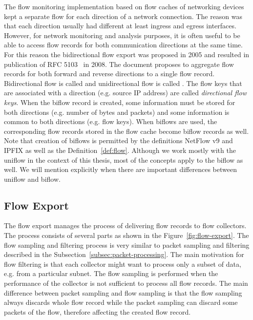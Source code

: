 The flow monitoring implementation based on flow caches of networking devices kept a separate flow for each direction of a network connection. The reason was that each direction usually had different at least  ingress and egress interfaces. However, for network monitoring and analysis purposes, it is often useful to be able to access flow records for both communication directions at the same time. For this reason the bidirectional flow export was proposed in 2005 and resulted in publication of RFC 5103~\cite{rfc5103} in 2008. The document proposes to aggregate flow records for both forward and reverse directions to a single flow record. Bidirectional flow is called \emph{} and unidirectional flow is called \emph{}. The flow keys that are associated with a direction (e.g. source IP address) are called \emph{directional flow keys}. When the biflow record is created, some information must be stored for both directions (e.g. number of bytes and packets) and some information is common to both directions (e.g. flow keys). When biflows are used, the corresponding flow records stored in the flow cache become biflow records as well. Note that creation of biflows is permitted by the definitions NetFlow v9 and IPFIX as well as the Definition~\ref{def:flow}. Although we work mostly with the uniflow in the context of this thesis, most of the concepts apply to the biflow as well. We will mention explicitly when there are important differences between uniflow and biflow.

\subsection{Flow Export}

The flow export manages the process of delivering flow records to flow collectors. The process consists of several parts as shown in the Figure~\ref{fig:flow-export}. The flow sampling and filtering process is very similar to packet sampling and filtering described in the Subsection~\ref{subsec:packet-processing}. The main motivation for flow filtering is that each collector might want to process only a subset of data, e.g. from a particular subnet. The flow sampling is performed when the performance of the collector is not sufficient to process all flow records. The main difference between packet sampling and flow sampling is that the flow sampling always discards whole flow record while the packet sampling can discard some packets of the flow, therefore affecting the created flow record. 

